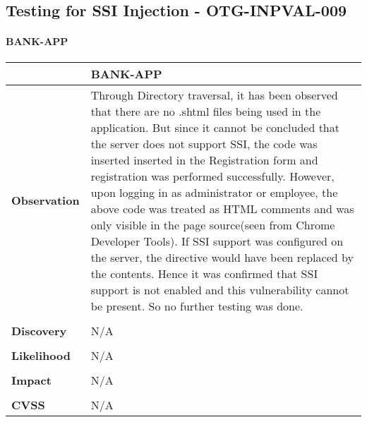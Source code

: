 \subsection{Testing for SSI Injection - OTG-INPVAL-009}

\paragraph{BANK-APP} \mbox{}
\begin{longtable*}{p{.20\textwidth} | p{.80\textwidth}}
    \hline
    & \textbf{BANK-APP} \\
    \hline
    \textbf{Observation} &
	Through Directory traversal, it has been observed that there are no .shtml files being used in the application. But since it cannot be concluded that the server does not support SSI,
	the code  was inserted inserted in the Registration form and registration was performed successfully.
	However, upon logging in as administrator or employee, the above code was treated as HTML comments and was only visible in the page source(seen from Chrome Developer Tools).
	If SSI support was configured on the server, the directive would have been replaced by the contents.
	Hence it was confirmed that SSI support is not enabled and this vulnerability cannot be present. So no further testing was done.
    \\\\
    \textbf{Discovery} &
      N/A
     \\\\
    \textbf{Likelihood} &
        N/A
    \\\\
    \textbf{Impact} &
       N/A
    \\\\
    \textbf{CVSS} &
     N/A
    \\
    \hline
\end{longtable*}

